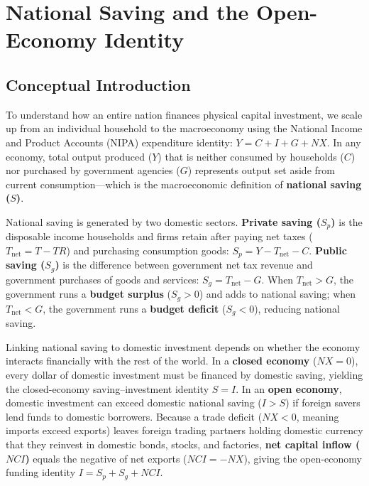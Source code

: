 \documentclass[11pt,letterpaper]{article}
\begin{document}
\section{National Saving and the Open-Economy Identity}

\subsection*{Conceptual Introduction}
To understand how an entire nation finances physical capital investment, we scale up from an individual household to the macroeconomy using the National Income and Product Accounts (NIPA) expenditure identity: $Y = C + I + G + NX$. In any economy, total output produced ($Y$) that is neither consumed by households ($C$) nor purchased by government agencies ($G$) represents output set aside from current consumption—which is the macroeconomic definition of \textbf{national saving ($S$)}.

National saving is generated by two domestic sectors. \textbf{Private saving ($S_p$)} is the disposable income households and firms retain after paying net taxes ($T_{\text{net}} = T - TR$) and purchasing consumption goods: $S_p = Y - T_{\text{net}} - C$. \textbf{Public saving ($S_g$)} is the difference between government net tax revenue and government purchases of goods and services: $S_g = T_{\text{net}} - G$. When $T_{\text{net}} > G$, the government runs a \textbf{budget surplus} ($S_g > 0$) and adds to national saving; when $T_{\text{net}} < G$, the government runs a \textbf{budget deficit} ($S_g < 0$), reducing national saving.

Linking national saving to domestic investment depends on whether the economy interacts financially with the rest of the world. In a \textbf{closed economy} ($NX = 0$), every dollar of domestic investment must be financed by domestic saving, yielding the closed-economy saving--investment identity $S = I$. In an \textbf{open economy}, domestic investment can exceed domestic national saving ($I > S$) if foreign savers lend funds to domestic borrowers. Because a trade deficit ($NX < 0$, meaning imports exceed exports) leaves foreign trading partners holding domestic currency that they reinvest in domestic bonds, stocks, and factories, \textbf{net capital inflow ($NCI$)} equals the negative of net exports ($NCI = -NX$), giving the open-economy funding identity $I = S_p + S_g + NCI$.
\end{document}
